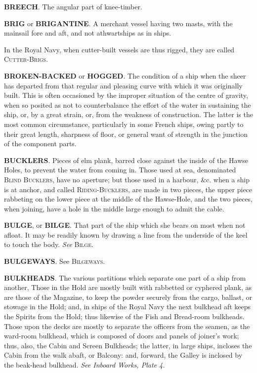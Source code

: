 \textbf{BREECH}. The angular part of knee-timber. 

\textbf{BRIG} or \textbf{BRIGANTINE}. A merchant vessel having two masts, with the mainsail fore and aft, and not athwartships as in ships. 

In the Royal Navy, when cutter-built vessels are thus rigged, they are called \textsc{Cutter-Brigs}. 

\textbf{BROKEN-BACKED} or \textbf{HOGGED}. The condition of a ship when the sheer has departed from that regular and pleasing curve with which it was originally built. This is often occasioned by the improper situation of the centre of gravity, when so posited as not to counterbalance the effort of the water in sustaining the ship, or, by a great strain, or, from the weakness of construction. The latter is the most common circumstance, particularly in some French ships, owing partly to their great length, sharpness of floor, or general want of strength in the junction of the component parts.

\textbf{BUCKLERS}. Pieces of elm plank, barred close against the inside of the Hawse Holes, to prevent the water from coming in. Those used at sea, denominated \textsc{Blind Bucklers}, have no aperture; but those used in a harbour, \&c. when a ship is at anchor, and called \textsc{Riding-Bucklers}, are made in two pieces, the upper piece rabbeting on the lower piece at the middle of the Hawse-Hole, and the two pieces, when joining, have a hole in the middle large enough to admit the cable. 

\textbf{BULGE}, or \textbf{BILGE}. That part of the ship which she bears on most when not afloat. It may be readily known by drawing a line from the underside of the keel to touch the body. \textit{See} \textsc{Bilge}. 

\textbf{BULGEWAYS}. See \textsc{Bilgeways}. 

\textbf{BULKHEADS}. The various partitions which separate one part of a ship from another, Those in the Hold are mostly built with rabbetted or cyphered plank, as are those of the Magazine, to keep the powder securely from the cargo, ballast, or stowage in the Hold; and, in ships of the Royal Navy the next bulkhead aft keeps the Spirits from the Hold; thus likewise of the Fish and Bread-room bulkheads. Those upon the decks are mostly to separate the officers from the seamen, as the ward-room bulkhead, which is composed of doors and panels of joiner's work; thus, also, the Cabin and Screen Bulkheads; the latter, in large ships, incloses the Cabin from the walk abaft, or Balcony: and, forward, the Galley is inclosed by the beak-head bulkhead. \textit{See Inboard Works, Plate 4.} 

